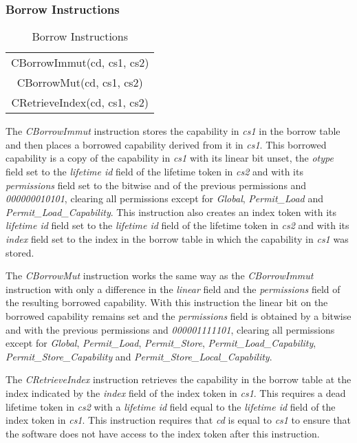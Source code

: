 \subsubsection{Borrow Instructions}

\begin{table}[h]
\centering
\begin{tabular}{| c |}
\hline
 CBorrowImmut(cd, cs1, cs2) \\
 CBorrowMut(cd, cs1, cs2) \\
 CRetrieveIndex(cd, cs1, cs2) \\
\hline
\end{tabular}
\caption{Borrow Instructions}
\label{table:borrowedinstsborrow}
\end{table}

The \textit{CBorrowImmut} instruction stores the capability in \textit{cs1} in the borrow table and then places a borrowed capability derived from it in \textit{cs1}. This borrowed capability is a copy of the capability in \textit{cs1} with its linear bit unset, the \textit{otype} field set to the \textit{lifetime id} field of the lifetime token in \textit{cs2} and with its \textit{permissions} field set to the bitwise and of the previous permissions and \textit{000000010101}, clearing all permissions except for \textit{Global}, \textit{Permit\_Load} and \textit{Permit\_Load\_Capability}. This instruction also creates an index token with its \textit{lifetime id} field set to the \textit{lifetime id} field of the lifetime token in \textit{cs2} and with its \textit{index} field set to the index in the borrow table in which the capability in \textit{cs1} was stored.

The \textit{CBorrowMut} instruction works the same way as the \textit{CBorrowImmut} instruction with only a difference in the \textit{linear} field and the \textit{permissions} field of the resulting borrowed capability. With this instruction the linear bit on the borrowed capability remains set and the \textit{permissions} field is obtained by a bitwise and with the previous permissions and \textit{000001111101}, clearing all permissions except for \textit{Global}, \textit{Permit\_Load}, \textit{Permit\_Store}, \textit{Permit\_Load\_Capability}, \textit{Permit\_Store\_Capability} and \textit{Permit\_Store\_Local\_Capability}.

The \textit{CRetrieveIndex} instruction retrieves the capability in the borrow table at the index indicated by the \textit{index} field of the index token in \textit{cs1}. This requires a dead lifetime token in \textit{cs2} with a \textit{lifetime id} field equal to the \textit{lifetime id} field of the index token in \textit{cs1}. This instruction requires that \textit{cd} is equal to \textit{cs1} to ensure that the software does not have access to the index token after this instruction.

